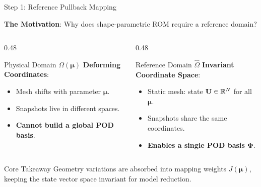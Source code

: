 \begin{frame}{Step 1: Reference Pullback Mapping}
  \centering
  \vspace{-0.1cm}

  {\small\textbf{The Motivation}: Why does shape-parametric ROM require a reference domain?}
  \par\vspace{0.3cm}

  \begin{columns}[T]
    \begin{column}{0.48\textwidth}
      \begin{block}{Physical Domain $\Omega(\boldsymbol{\mu})$}
        \footnotesize
        \textbf{Deforming Coordinates}:
        \begin{itemize}
          \setlength{\itemsep}{0.1cm}
          \item Mesh shifts with parameter $\boldsymbol{\mu}$.
          \item Snapshots live in different spaces.
          \item \textcolor{cnamred}{\textbf{Cannot build a global POD basis}}.
        \end{itemize}
      \end{block}
    \end{column}

    \begin{column}{0.48\textwidth}
      \begin{exampleblock}{Reference Domain $\hat{\Omega}$}
        \footnotesize
        \textbf{Invariant Coordinate Space}:
        \begin{itemize}
          \setlength{\itemsep}{0.1cm}
          \item Static mesh: state $\mathbf{U} \in \mathbb{R}^N$ for all $\boldsymbol{\mu}$.
          \item Snapshots share the same coordinates.
          \item \textcolor{teal!80!black}{\textbf{Enables a single POD basis $\boldsymbol{\Phi}$}}.
        \end{itemize}
      \end{exampleblock}
    \end{column}
  \end{columns}

  \vspace{0.3cm}

  \begin{alertblock}{Core Takeaway}
    \centering\footnotesize
    Geometry variations are absorbed into mapping weights $J(\boldsymbol{\mu})$, keeping the state vector space invariant for model reduction.
  \end{alertblock}
\end{frame}

